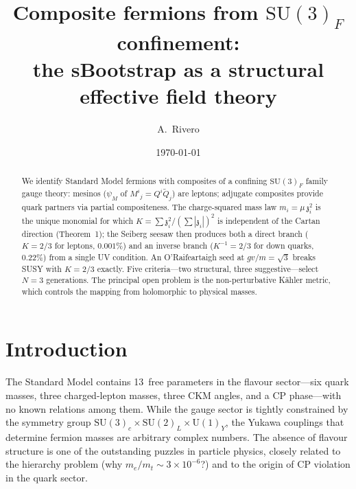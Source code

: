 \documentclass[aps,prd,twocolumn,showpacs,preprintnumbers,superscriptaddress,floatfix]{revtex4-2}
\newcommand{\SU}{\mathrm{SU}}
\newcommand{\UU}{\mathrm{U}}
\newcommand{\zch}{\mathfrak{z}}
\begin{document}
\title{Composite fermions from $\SU(3)_F$ confinement:\\
  the sBootstrap as a structural effective field theory}

\author{A.~Rivero}

\date{\today}

\begin{abstract}
We identify Standard Model fermions with composites of a
confining $\SU(3)_F$ family gauge theory: mesinos
($\psi_M$ of $M^i{}_j = Q^i\tilde{Q}_j$) are leptons;
adjugate composites provide quark partners via partial
compositeness.
The charge-squared mass law $m_i = \mu\,\zch_i^2$ is the
unique monomial for which $K = \sum\zch_i^2/(\sum|\zch_i|)^2$
is independent of the Cartan direction (Theorem~1);
the Seiberg seesaw then produces both a direct branch
($K = 2/3$ for leptons, $0.001\%$) and an inverse branch
($K^{-1} = 2/3$ for down quarks, $0.22\%$) from a single UV
condition.
An O'Raifeartaigh seed at $gv/m = \sqrt{3}$ breaks SUSY with
$K = 2/3$ exactly.
Five criteria---two structural, three suggestive---select
$N = 3$ generations.
The principal open problem is the non-perturbative K\"ahler
metric, which controls the mapping from holomorphic to physical
masses.
\end{abstract}

\maketitle


\section{Introduction}
\label{sec:intro}

The Standard Model contains 13~free parameters in the flavour
sector---six quark masses, three charged-lepton masses, three CKM
angles, and a CP phase---with no known relations among them.
While the gauge sector is tightly constrained by the symmetry
group $\SU(3)_c \times \SU(2)_L \times \UU(1)_Y$, the Yukawa
couplings that determine fermion masses are arbitrary complex
numbers.
The absence of flavour structure is one of the outstanding
puzzles in particle physics, closely related to the hierarchy
problem (why $m_e/m_t \sim 3 \times 10^{-6}$?) and to the
origin of CP violation in the quark sector.
\end{document}

